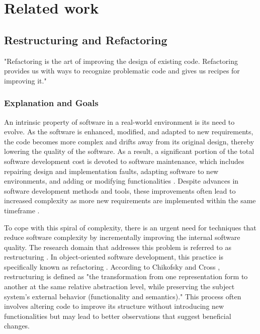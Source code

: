 
%

\chapter{Related work}
\label{cha:Related work}
    




\section{Restructuring and Refactoring}

"Refactoring is the art of improving the design of existing code. Refactoring provides us with ways to recognize problematic code and gives us recipes for improving it." \cite{wake2004refactoring} 

\cite{Refactoring2020} \cite{30yearsSoftwareRefactoring2020} \cite{smellsRefactoring2020} \cite{RefactoringFowler2002} \cite{SurveyRefactoring2004} \cite{estructuringArnold1989}

\subsection{Explanation and Goals}
An intrinsic property of software in a real-world environment is its need to evolve. As the software is enhanced, modified, and adapted to new requirements, the code becomes more complex and drifts away from its original design, thereby lowering the quality of the software. As a result, a significant portion of the total software development cost is devoted to software maintenance, which includes repairing design and implementation faults, adapting software to new environments, and adding or modifying functionalities   . Despite advances in software development methods and tools, these improvements often lead to increased complexity as more new requirements are implemented within the same timeframe .

To cope with this spiral of complexity, there is an urgent need for techniques that reduce software complexity by incrementally improving the internal software quality. The research domain that addresses this problem is referred to as restructuring    . In object-oriented software development, this practice is specifically known as refactoring . According to Chikofsky and Cross , restructuring is defined as "the transformation from one representation form to another at the same relative abstraction level, while preserving the subject system’s external behavior (functionality and semantics)." This process often involves altering code to improve its structure without introducing new functionalities but may lead to better observations that suggest beneficial changes.

